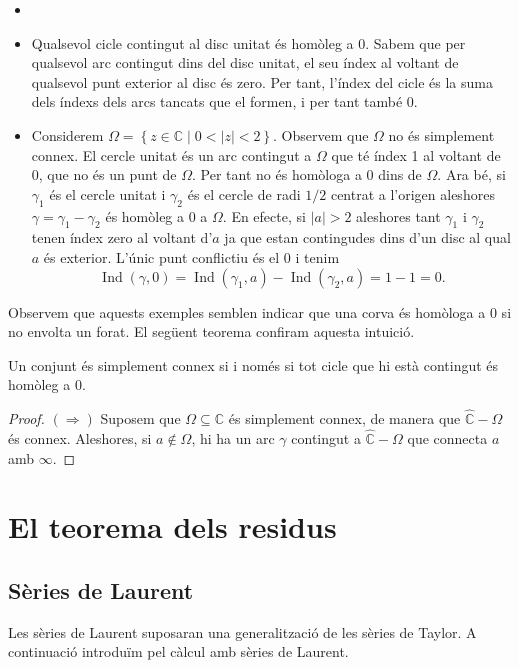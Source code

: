 \documentclass[12pt,twoside]{report}
\numberwithin{table}{section}
\numberwithin{equation}{section}
\numberwithin{figure}{section}
\newcommand{\C}{\ensuremath{\mathbb{C}}}
\newcommand{\Ci}{\ensuremath{\hat{\mathbb{C}}}}
\newcommand{\set}[2]{\left\{ #1 \mid #2 \right\}}
\newcommand{\abs}[1]{\left\lvert #1 \right\rvert}
\DeclareMathOperator{\Ind}{Ind}
\begin{document}
\begin{exe}
	\begin{itemize}
		\item[]
		\item Qualsevol cicle contingut al disc unitat és homòleg a 0. Sabem que per qualsevol arc contingut dins del disc unitat, el seu índex al voltant de qualsevol punt exterior al disc és zero. Per tant, l'índex del cicle és la suma dels índexs dels arcs tancats que el formen, i per tant també 0. 
		\item Considerem \( \Omega = \set{z \in \C}{0 < \abs{z} < 2} \). Observem que \( \Omega \) no és simplement connex. El cercle unitat és un arc contingut a \( \Omega \) que té índex 1 al voltant de 0, que no és un punt de \( \Omega \). Per tant no és homòloga a 0 dins de \( \Omega \).
			Ara bé, si \( \gamma_1 \) és el cercle unitat i \( \gamma_2 \) és el cercle de radi \( 1/2 \) centrat a l'origen aleshores \( \gamma = \gamma_1 - \gamma_2 \) és homòleg a 0 a \( \Omega \). En efecte, si \( \abs{a} > 2 \) aleshores tant \( \gamma_1 \) i \( \gamma_2 \) tenen índex zero al voltant d'\( a \) ja que estan contingudes dins d'un disc al qual \( a \) és exterior. L'únic punt conflictiu és el 0 i tenim
			\begin{equation*}
				\Ind(\gamma, 0) = \Ind(\gamma_1, a) - \Ind(\gamma_2, a) = 1 - 1 = 0.
			\end{equation*}
	\end{itemize}
\end{exe}

Observem que aquests exemples semblen indicar que una corva és homòloga a 0 si no envolta un forat. El següent teorema confiram aquesta intuició.
\begin{teo}
	Un conjunt és simplement connex si i només si tot cicle que hi està contingut és homòleg a 0.
\end{teo}
\begin{proof}
	\( (\Rightarrow) \) Suposem que \( \Omega \subseteq \C \) és simplement connex, de manera que \( \Ci - \Omega \) és connex. Aleshores, si \( a \notin \Omega \), hi ha un arc \( \gamma \) contingut a \( \Ci - \Omega \) que connecta \( a \) amb \( \infty \).
\end{proof}

\chapter{El teorema dels residus}
\section{Sèries de Laurent}
Les sèries de Laurent suposaran una generalització de les sèries de Taylor. A continuació introduïm pel càlcul amb sèries de Laurent.  
\end{document}
